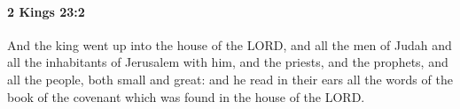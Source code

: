 
		\paragraph{2 Kings 23:2} %
			\label{2KINGS-23-2}

			And the king went up into the house of the LORD, and all the men of Judah and all the inhabitants of Jerusalem with him, and the priests, and the prophets, and all the people, both small and great: and he read in their ears all the words of the book of the covenant which was found in the house of the LORD.


